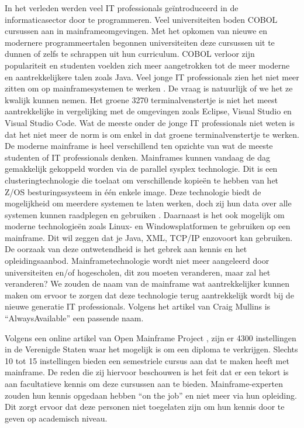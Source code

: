 In het verleden werden veel IT professionals geïntroduceerd in de informaticasector door te programmeren. Veel universiteiten boden COBOL cursussen aan in mainframeomgevingen. Met het opkomen van nieuwe en modernere programmeertalen begonnen universiteiten deze cursussen uit te dunnen of zelfs te schrappen uit hun curriculum. COBOL verloor zijn populariteit en studenten voelden zich meer aangetrokken tot de meer moderne en aantrekkelijkere talen zoals Java. Veel jonge IT professionals zien het niet meer zitten om op mainframesystemen te werken \autocite{Mullins2016}. De vraag is natuurlijk of we het ze kwalijk kunnen nemen. Het groene 3270 terminalvenstertje is niet het meest aantrekkelijke in vergelijking met de omgevingen zoals Eclipse, Visual Studio en Visual Studio Code. Wat de meeste onder de jonge IT professionals niet weten is dat het niet meer de norm is om enkel in dat groene terminalvenstertje te werken. De moderne mainframe is heel verschillend ten opzichte van wat de meeste studenten of IT professionals denken. Mainframes kunnen vandaag de dag gemakkelijk gekoppeld worden via de parallel sysplex technologie. Dit is een clusteringtechnologie die toelaat om verschillende kopieën te hebben van het Z/OS besturingssysteem in één enkele image. Deze technologie biedt de mogelijkheid om meerdere systemen te laten werken, doch zij hun data over alle systemen kunnen raadplegen en gebruiken \autocite{Sarkar2020}. Daarnaast is het ook mogelijk om moderne technologieën zoals Linux- en Windowsplatformen te gebruiken op een mainframe. Dit wil zeggen dat je Java, XML, TCP/IP enzovoort kan gebruiken. De oorzaak van deze ontwetendheid is het gebrek aan kennis en het opleidingsaanbod. Mainframetechnologie wordt niet meer aangeleerd door universiteiten en/of hogescholen, dit zou moeten veranderen, maar zal het veranderen? We zouden de naam van de mainframe wat aantrekkelijker kunnen maken om ervoor te zorgen dat deze technologie terug aantrekkelijk wordt bij de nieuwe generatie IT professionals. Volgens het artikel van Craig Mullins is ``AlwaysAvailable'' een passende naam. 

Volgens een online artikel van Open Mainframe Project \autocite{2020}, zijn er 4300 instellingen in de Verenigde Staten waar het mogelijk is om een diploma te verkrijgen. Slechts 10 tot 15 instellingen bieden een semestriele cursus aan dat te maken heeft met mainframe. De reden die zij hiervoor beschouwen is het feit dat er een tekort is aan facultatieve kennis om deze cursussen aan te bieden. Mainframe-experten zouden hun kennis opgedaan hebben ``on the job'' en niet meer via hun opleiding. Dit zorgt ervoor dat deze personen niet toegelaten zijn om hun kennis door te geven op academisch niveau. 

